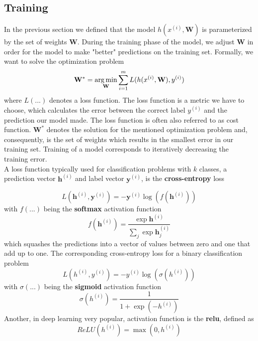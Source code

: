 \subsection{Training}
In the previous section we defined that the model $h(x^{(i)}, \mathbf{W})$ is parameterized by the set of weights $\textbf{W}$. During the training phase of the model, we adjust $\textbf{W}$ in order for the model to make "better" predictions on the training set. Formally, we want to solve the optimization problem
\begin{equation}
   \mathbf{W}^{*} = \operatorname*{arg\,min}_\textbf{W} \sum_{i=1}^{m} L(h(x^{(i)}, \mathbf{W}), y^{(i)})
   \label{eq:optimization}
\end{equation}
where $L(...)$ denotes a loss function. The loss function is a metric we have to choose, which calculates the error between the correct label $y^{(i)}$ and the prediction our model made. The loss function is often also referred to as cost function. $\mathbf{W}^{*}$ denotes the solution for the mentioned optimization problem and, consequently, is the set of weights which results in the smallest error in our training set. Training of a model corresponds to iteratively decreasing the training error.\\
A loss function typically used for classification problems with $k$ classes, a prediction vector $\mathbf{h}^{(i)}$ and label vector $\mathbf{y}^{(i)}$, is the \textbf{cross-entropy} loss

\begin{equation}
    L(\mathbf{h}^{(i)}, \mathbf{y}^{(i)}) = -\mathbf{y}^{(i)} \log(f(\mathbf{h}^{(i)}))
    \label{eq:cross_entropy_multi}
\end{equation}
with $f(...)$ being the \textbf{softmax} activation function
\begin{equation}
   f(\mathbf{h}^{(i)}) = \frac{\exp\mathbf{h}^{(i)}}{\sum_{j} \exp{\mathbf{h}^{(i)}_{j}}}
   \label{eq:softmax}
\end{equation}
which squashes the predictions into a vector of values between zero and one that add up to one. The corresponding cross-entropy loss for a binary classification problem
\begin{equation}
    L({h}^{(i)}, {y}^{(i)}) = -{y}^{(i)} \log(\sigma({h}^{(i)}))
    \label{eq:cross_entropy_binary}
\end{equation}
with $\sigma(...)$ being the \textbf{sigmoid} activation function
\begin{equation}
   \sigma({h}^{(i)}) = \frac{1}{1 + \exp{(-{h}^{(i)})}}
   \label{eq:sigmoid}
\end{equation}
Another, in deep learning very popular, activation function is the \textbf{\gls{relu}}, defined as
\begin{equation}
   ReLU({h}^{(i)}) = \max(0, {h}^{(i)})
   \label{eq:relu}
\end{equation}

